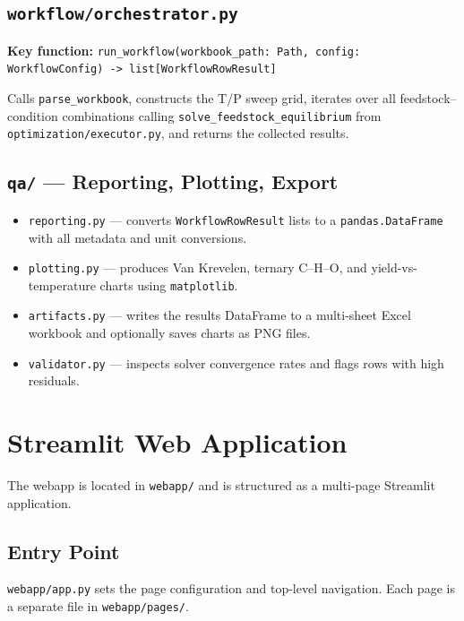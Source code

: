\documentclass[12pt, a4paper]{article}
\begin{document}
\subsection{\texttt{workflow/orchestrator.py}}

\textbf{Key function:} \texttt{run\_workflow(workbook\_path: Path, config: WorkflowConfig) -> list[WorkflowRowResult]}

Calls \texttt{parse\_workbook}, constructs the T/P sweep grid, iterates over all feedstock--condition combinations calling \texttt{solve\_feedstock\_equilibrium} from \texttt{optimization/executor.py}, and returns the collected results.

\subsection{\texttt{qa/} — Reporting, Plotting, Export}

\begin{itemize}
    \item \texttt{reporting.py} — converts \texttt{WorkflowRowResult} lists to a \texttt{pandas.DataFrame} with all metadata and unit conversions.
    \item \texttt{plotting.py} — produces Van Krevelen, ternary C--H--O, and yield-vs-temperature charts using \texttt{matplotlib}.
    \item \texttt{artifacts.py} — writes the results DataFrame to a multi-sheet Excel workbook and optionally saves charts as PNG files.
    \item \texttt{validator.py} — inspects solver convergence rates and flags rows with high residuals.
\end{itemize}

\section{Streamlit Web Application}

The webapp is located in \texttt{webapp/} and is structured as a multi-page Streamlit application.

\subsection{Entry Point}

\texttt{webapp/app.py} sets the page configuration and top-level navigation. Each page is a separate file in \texttt{webapp/pages/}.
\end{document}
